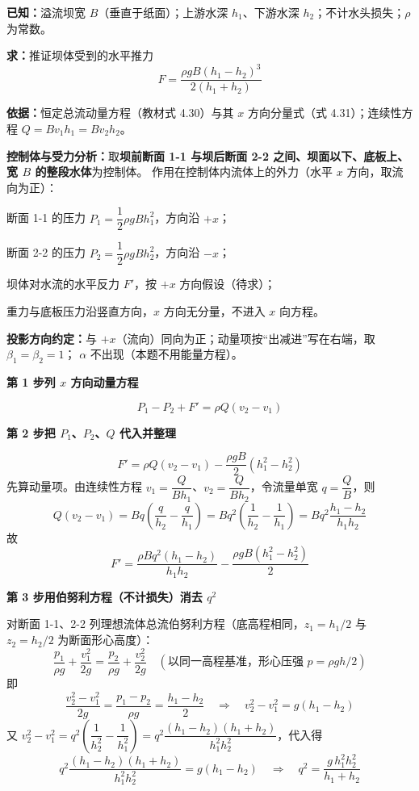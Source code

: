 \begin{jie}
\textbf{已知：}溢流坝宽 $B$（垂直于纸面）；上游水深 $h_1$、下游水深 $h_2$；不计水头损失；$\rho$ 为常数。

\textbf{求：}推证坝体受到的水平推力
\[ F=\frac{\rho gB(h_1-h_2)^3}{2(h_1+h_2)} \]

\textbf{依据：}恒定总流动量方程（教材式 4.30）与其 $x$ 方向分量式（式 4.31）；连续性方程 $Q=Bv_1h_1=Bv_2h_2$。

\textbf{控制体与受力分析：}取\textbf{坝前断面 1-1 与坝后断面 2-2 之间、坝面以下、底板上、宽 $B$ 的整段水体}为控制体。
作用在控制体内流体上的外力（水平 $x$ 方向，取流向为正）：
\begin{xiaowen}
\item 断面 1-1 的压力 $P_1=\dfrac{1}{2}\rho gBh_1^2$，方向沿 $+x$；
\item 断面 2-2 的压力 $P_2=\dfrac{1}{2}\rho gBh_2^2$，方向沿 $-x$；
\item 坝体对水流的水平反力 $F'$，按 $+x$ 方向假设（待求）；
\item 重力与底板压力沿竖直方向，$x$ 方向无分量，不进入 $x$ 向方程。
\end{xiaowen}
\textbf{投影方向约定：}与 $+x$（流向）同向为正；动量项按“出减进”写在右端，取 $\beta_1=\beta_2=1$；
$\alpha$ 不出现（本题不用能量方程）。

\textbf{第 1 步\quad 列 $x$ 方向动量方程}

\[ P_1-P_2+F'=\rho Q(v_2-v_1) \]

\textbf{第 2 步\quad 把 $P_1$、$P_2$、$Q$ 代入并整理}

\[ F'=\rho Q(v_2-v_1)-\frac{\rho gB}{2}\left(h_1^2-h_2^2\right) \]
先算动量项。由连续性方程 $v_1=\dfrac{Q}{Bh_1}$、$v_2=\dfrac{Q}{Bh_2}$，令流量单宽 $q=\dfrac{Q}{B}$，则
\[ Q(v_2-v_1)=Bq\left(\frac{q}{h_2}-\frac{q}{h_1}\right)=Bq^2\left(\frac{1}{h_2}-\frac{1}{h_1}\right)
   =Bq^2\frac{h_1-h_2}{h_1h_2} \]
故
\[ F'=\frac{\rho Bq^2(h_1-h_2)}{h_1h_2}-\frac{\rho gB\left(h_1^2-h_2^2\right)}{2} \]

\textbf{第 3 步\quad 用伯努利方程（不计损失）消去 $q^2$}

对断面 1-1、2-2 列理想流体总流伯努利方程（底高程相同，$z_1=h_1/2$ 与 $z_2=h_2/2$ 为断面形心高度）：
\[ \frac{p_1}{\rho g}+\frac{v_1^2}{2g}=\frac{p_2}{\rho g}+\frac{v_2^2}{2g}\quad(\text{以同一高程基准，形心压强 } p=\rho g h/2) \]
即
\[ \frac{v_2^2-v_1^2}{2g}=\frac{p_1-p_2}{\rho g}=\frac{h_1-h_2}{2}
   \quad\Longrightarrow\quad v_2^2-v_1^2=g(h_1-h_2) \]
又 $v_2^2-v_1^2=q^2\left(\dfrac{1}{h_2^2}-\dfrac{1}{h_1^2}\right)
=q^2\dfrac{(h_1-h_2)(h_1+h_2)}{h_1^2h_2^2}$，代入得
\[ q^2\frac{(h_1-h_2)(h_1+h_2)}{h_1^2h_2^2}=g(h_1-h_2)
   \quad\Longrightarrow\quad
   q^2=\frac{g\,h_1^2h_2^2}{h_1+h_2} \]


\end{jie}
